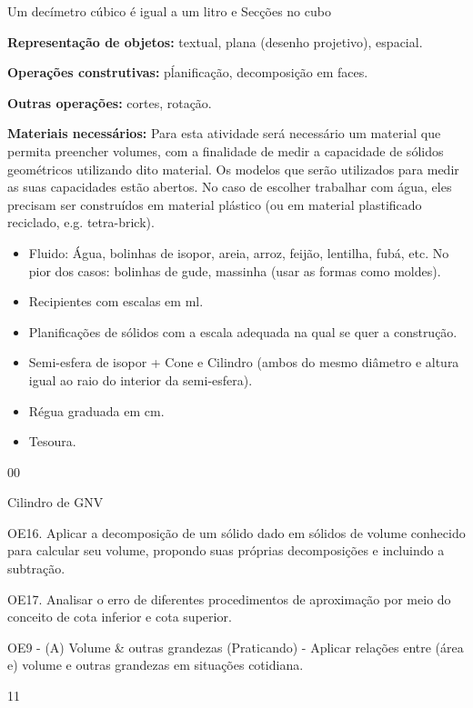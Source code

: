 \begin{sugestions}{Um decímetro cúbico é igual a um litro e Secções no cubo}
{
\textbf{Representação de objetos:} textual, plana (desenho projetivo), espacial.

\textbf{Operações construtivas:} pĺanificação, decomposição em faces.

\textbf{Outras operações:} cortes, rotação.

\textbf{Materiais necessários:} Para esta atividade será necessário um material que permita preencher volumes, com a finalidade de medir a capacidade de sólidos geométricos utilizando dito material. Os modelos que serão utilizados para medir as suas capacidades estão abertos. No caso de escolher trabalhar com água, eles precisam ser construídos em material plástico (ou em material plastificado reciclado, e.g. tetra-brick).
\begin{itemize}
\item {} 
Fluido: Água, bolinhas de isopor, areia, arroz, feijão, lentilha, fubá, etc. No pior dos casos: bolinhas de gude, massinha (usar as formas como moldes).

\item {} 
Recipientes com escalas em ml.

\item {} 
Planificações de sólidos com a escala adequada na qual se quer a construção.

\item {} 
Semi-esfera de isopor + Cone e Cilindro (ambos do mesmo diâmetro e altura igual ao raio do interior da semi-esfera).

\item {} 
Régua graduada em cm.

\item {} 
Tesoura.
\end{itemize}
}{0}{0}
\end{sugestions}
\clearmargin
\clearmargin
\clearmargin
\begin{objectives}{Cilindro de GNV}
{
OE16. Aplicar a decomposição de um sólido dado em sólidos de volume conhecido para calcular seu volume, propondo suas próprias decomposições e incluindo a subtração.

OE17. Analisar o erro de diferentes procedimentos de aproximação por meio do conceito de cota inferior e cota superior.

OE9 - (A) Volume \& outras grandezas (Praticando) - Aplicar relações entre (área e) volume e outras grandezas em situações cotidiana.
}{1}{1}
\end{objectives}
